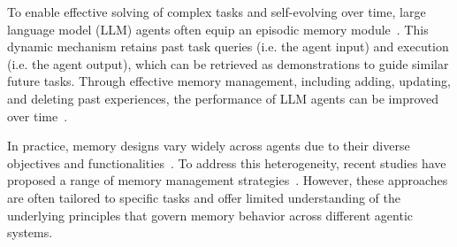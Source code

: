 \documentclass[11pt]{article}
\theoremstyle{plain}
\theoremstyle{definition}
\newcommand{\zhen}[1]{\textcolor{blue}{[Zhen: #1]}}
\begin{document}

To enable effective solving of complex tasks and self-evolving over time, large language model (LLM) agents often equip an episodic memory module~\cite{wang2024survey}.
This dynamic mechanism retains past task queries (i.e. the agent input) and execution (i.e. the agent output), which can be retrieved as demonstrations to guide similar future tasks.
Through effective memory management, including adding, updating, and deleting past experiences, the performance of LLM agents can be improved over time~\cite{zhang2024survey}.

{
In practice, memory designs vary widely across agents due to their diverse objectives and functionalities~\cite{shi2024ehragent,mao2023language,wang2023voyager,li2023tradinggpt,park2023generative,xiang2024guardagent}.
To address this heterogeneity, recent studies have proposed a range of memory management strategies~\cite{yin2024explicit,zeng2024structural,zhao2024expel,zhong2024memorybank,xu2025mem}.
However, these approaches are often tailored to specific tasks and offer limited understanding of the underlying principles that govern memory behavior across different agentic systems.
}
\end{document}
